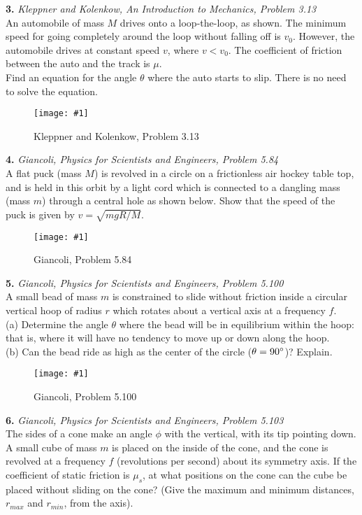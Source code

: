 \documentclass[11pt]{article}
\newcommand{\fig}[4]{
    \begin{figure}[H]
        \centering
        \texttt{[image: \#1]}
        \caption{#2}
        \label{exp4fit}
    \end{figure}
}
\theoremstyle{gangnamstyle}{\newtheorem{definition}{Definition}[]}
\theoremstyle{gangnamstyle}{\newtheorem{example}{Example}[]}
\theoremstyle{gangnamstyle}{\newtheorem{problem}{Problem}[]}
\begin{document}
\pagebreak

\textbf{3.} \textit{Kleppner and Kolenkow, An Introduction to Mechanics, Problem 3.13} \\
An automobile of mass $M$ drives onto a loop-the-loop, as shown. The minimum speed for going completely around the loop without falling off is $v_0$. However, the automobile drives at constant speed
$v$, where $v < v_0$. The coefficient of friction between the auto and
the track is $\mu$. \\
Find an equation for the angle $\theta$ where the auto starts to slip. There is no need to solve the equation. 
\fig{figs/0702/kk313.png}{Kleppner and Kolenkow, Problem 3.13}{0.65}{0} 

\pagebreak

\textbf{4.} \textit{Giancoli, Physics for Scientists and Engineers, Problem 5.84} \\
A flat puck (mass $M$) is revolved in a circle on a frictionless air hockey table top, and is held in this orbit by a light cord which is connected to a dangling mass (mass $m$) through a central hole as shown below. Show that the speed of the puck is given by $v = \sqrt{mgR/M}$. 
\fig{figs/0627/giancoli584.png}{Giancoli, Problem 5.84}{0.65}{0} 

\pagebreak

\textbf{5.} \textit{Giancoli, Physics for Scientists and Engineers, Problem 5.100} \\
A small bead of mass $m$ is constrained to slide without friction inside a circular vertical hoop of radius $r$ which rotates about a vertical axis at a frequency $f$. \\
(a) Determine the angle $\theta$ where the bead will be in equilibrium within the hoop: that is, where it will have no tendency to move up or down along the hoop. \\
(b) Can the bead ride as high as the center of the circle ($\theta = 90\degree$)? Explain.
\fig{figs/0627/giancoli5100.png}{Giancoli, Problem 5.100}{0.5}{0} 

\pagebreak

\textbf{6.} \textit{Giancoli, Physics for Scientists and Engineers, Problem 5.103} \\
The sides of a cone make an angle $\phi$ with the vertical, with its tip pointing down. A small cube of mass $m$ is placed on the inside of the cone, and the cone is revolved at a frequency $f$ (revolutions per second) about its symmetry axis. If the coefficient of static friction is $\mu_s$, at what positions on the cone can the cube be placed without sliding on the cone? (Give the maximum and minimum distances, $r_{max}$ and $r_{min}$, from the axis).
\end{document}
